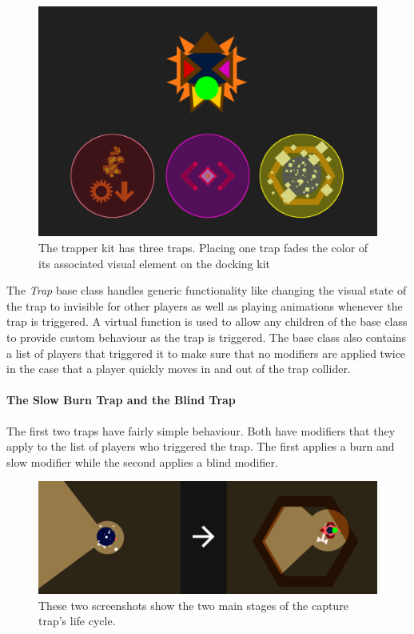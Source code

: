 \begin{figure}[tbph]  %
  \centering
  \includegraphics[width=.75\textwidth]{images/TrapperKitWithTraps}
  \caption[The trapper kit with its three traps]{The trapper kit has three traps. Placing one trap fades the color of its associated visual element on the docking kit}
  \label{fig:trapperKit}
\end{figure}

The \emph{Trap} base class handles generic functionality like changing the visual state of the trap to invisible for other players as well as playing animations whenever the trap is triggered. A virtual function is used to allow any children of the base class to provide custom behaviour as the trap is triggered. The base class also contains a list of players that triggered it to make sure that no modifiers are applied twice in the case that a player quickly moves in and out of the trap collider. 

\paragraph{The Slow Burn Trap and the Blind Trap}
The first two traps have fairly simple behaviour. Both have modifiers that they apply to the list of players who triggered the trap. The first applies a burn and slow modifier while the second applies a blind modifier. 

\begin{figure}[tbph]  %
  \centering
  \includegraphics[width=\textwidth]{images/trapperKitCaptureTrap}
  \caption[Two screenshots showing off capture trap of the trapper kit]{These two screenshots show the two main stages of the capture trap's life cycle.}
  \label{fig:trapperKitCapture}
\end{figure}

